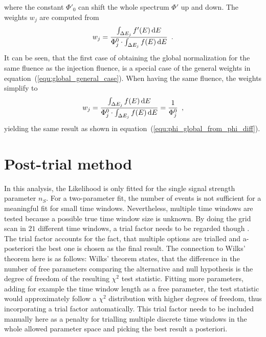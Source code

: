 where the constant $\Phi'_0$ can shift the whole spectrum $\Phi'$ up and down.
The weights $w_j$ are computed from
\begin{equation}
  \label{equ:global_general_case}
  w_j = \frac{\int_{\Delta E_j} f'(E)\,\text{d}E}
             {\Phi_j^0\cdot\int_{\Delta E_j} f(E)\,\text{d}E}
  \enspace\text{.}
\end{equation}
It can be seen, that the first case of obtaining the global normalization for the same fluence as the injection fluence, is a special case of the general weights in equation~(\ref{equ:global_general_case}).
When having the same fluence, the weights simplify to
\begin{equation}
  w_j = \frac{\int_{\Delta E_j} f(E)\,\text{d}E}
             {\Phi_j^0\cdot\int_{\Delta E_j} f(E)\,\text{d}E}
    = \frac{1}{\Phi_j^0}
  \enspace\text{,}
\end{equation}
yielding the same result as shown in equation~(\ref{equ:phi_global_from_phi_diff}).

\section{Post-trial method}
  \label{chp:time_dep_post_trial}
In this analysis, the Likelihood is only fitted for the single signal strength parameter $n_S$.
For a two-parameter fit, the number of events is not sufficient for a meaningful fit for small time windows.
Nevertheless, multiple time windows are tested because a possible true time window size is unknown.
By doing the grid scan in $\num{21}$ different time windows, a trial factor needs to be regarded though \cite{Gross:2010qma}.
The trial factor accounts for the fact, that multiple options are trialled and a-posteriori the best one is chosen as the final result.
The connection to Wilks' theorem here is as follows:
Wilks' theorem states, that the difference in the number of free parameters comparing the alternative and null hypothesis is the degree of freedom of the resulting $\chi^2$ test statistic.
Fitting more parameters, adding for example the time window length as a free parameter, the test statistic would approximately follow a $\chi^2$ distribution with higher degrees of freedom, thus incorporating a trial factor automatically.
This trial factor needs to be included manually here as a penalty for trialling multiple discrete time windows in the whole allowed parameter space and picking the best result a posteriori.

